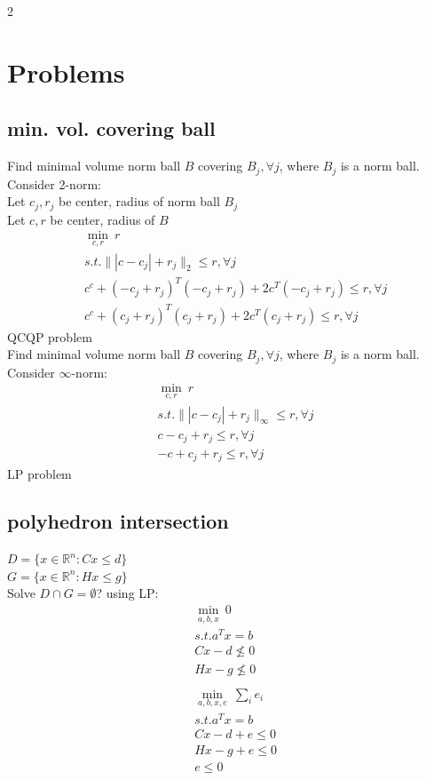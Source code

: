 \documentclass[8pt]{extarticle}
\newcommand{\R}{\mathbb{R}}
\newcommand{\norm}[1]{\|#1\|}
\newcommand{\set}[1]{\{#1\}}
\begin{document}
\begin{multicols*}{2}
  \pagebreak

  \section{Problems}
  \subsection{min. vol. covering ball}
  Find minimal volume norm ball $B$ covering $B_j, \forall j$, where $B_j$ is a norm ball. Consider 2-norm:\\

  Let $c_j, r_j$ be center, radius of norm ball $B_j$\\
  Let $c, r$ be center, radius of $B$
  \begin{align*}
    &\min_{c,r}\ r\\
    &s.t. \norm{|c-c_j|+r_j}_2 \leq r, \forall j\\
    &c^c + (-c_j+r_j)^T(-c_j+r_j) + 2c^T(-c_j+r_j) \leq r, \forall j\\
    &c^c + (c_j+r_j)^T(c_j+r_j) + 2c^T(c_j+r_j) \leq r, \forall j
  \end{align*}
  QCQP problem\\

  Find minimal volume norm ball $B$ covering $B_j, \forall j$, where $B_j$ is a norm ball. Consider $\infty$-norm:
  \begin{align*}
    &\min_{c,r}\ r\\
    &s.t. \norm{|c-c_j|+r_j}_{\infty} \leq r, \forall j\\
    &c-c_j+r_j \leq r, \forall j\\
    &-c+c_j+r_j \leq r, \forall j
  \end{align*}
  LP problem

  \subsection{polyhedron intersection}

  $D=\set{x\in\R^n: Cx \leq d}$\\
  $G=\set{x\in\R^n: Hx \leq g}$\\
  Solve $D \cap G = \emptyset$? using LP:
  \begin{align*}
    &\min_{a,b,x}\ 0\\
    &s.t. a^Tx=b\\
    &Cx-d \not \leq 0\\
    &Hx-g \not \leq 0\\
    \\
    &\min_{a,b,x,e}\ \sum_i e_i\\
    &s.t. a^Tx = b\\
    &Cx-d+e\leq 0\\
    &Hx-g+e\leq 0\\
    &e\leq 0
  \end{align*}


\end{multicols*}
\end{document}
